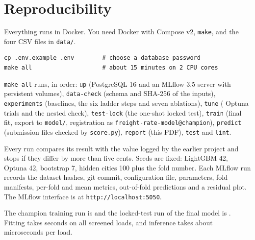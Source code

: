 \section{Reproducibility}

Everything runs in Docker. You need Docker with Compose v2, \texttt{make}, and the four CSV files in
\texttt{data/}.

\begin{verbatim}
cp .env.example .env        # choose a database password
make all                    # about 15 minutes on 2 CPU cores
\end{verbatim}

\texttt{make all} runs, in order: \texttt{up} (PostgreSQL 16 and an MLflow 3.5 server with persistent volumes),
\texttt{data-check} (schema and SHA-256 of the inputs), \texttt{experiments} (baselines, the six ladder steps and
seven ablations), \texttt{tune} (\TuneTrials{} Optuna trials and the nested check), \texttt{test-lock} (the
one-shot locked test), \texttt{train} (final fit, export to \texttt{model/}, registration as
\texttt{freight-rate-model@champion}), \texttt{predict} (submission files checked by \texttt{score.py}),
\texttt{report} (this PDF), \texttt{test} and \texttt{lint}.

Every run compares its result with the value logged by the earlier project and stops if they differ by more than
five cents. Seeds are fixed: LightGBM 42, Optuna 42, bootstrap 7, hidden cities 100 plus the fold number. Each
MLflow run records the dataset hashes, git commit, configuration file, parameters, fold manifests, per-fold and mean
metrics, out-of-fold predictions and a residual plot. The MLflow interface is at \texttt{http://localhost:5050}.

The champion training run is \texttt{\ChampionRun} and the locked-test run of the final model is
\texttt{\LockedTestRun}. Fitting takes \FitSeconds{} seconds on all \RowsAfterScreen{} screened loads, and
inference takes about \InferenceMicroseconds{} microseconds per load.
